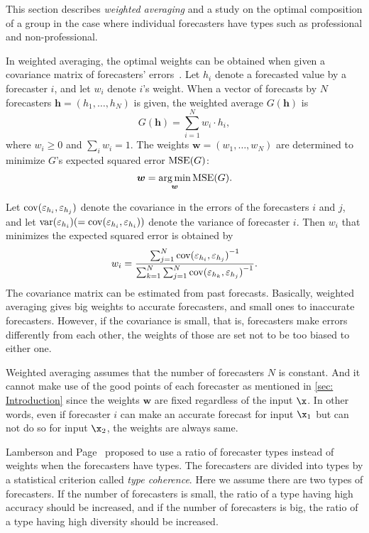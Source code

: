 \documentclass[../main.tex]{subfiles}
\begin{document}
This section describes \emph{weighted averaging} and a study on the optimal composition of a group in the case where individual forecasters have types such as professional and non-professional.

In weighted averaging, the optimal weights can be obtained when given a covariance matrix of forecasters' errors~\cite{Zhou2012}.
Let $h_i$ denote a forecasted value by a forecaster $i$, and let $w_i$ denote $i$'s weight.
When a vector of forecasts by $N$ forecasters $\bm{h} = (h_1, \ldots, h_N)$ is given, the weighted average $G(\bm{h})$ is
\begin{equation}
  G(\bm{h}) = \sum_{i=1}^N w_i \cdot h_i,
  \label{eq: weighted average}
\end{equation}
where $w_i \geq 0$ and $\sum_i w_i = 1$.
The weights $\bm{w} = (w_1, \ldots, w_N)$ are determined to minimize $G$'s expected squared error $\operatorname{MSE}(G)$:
\begin{equation}
  \bm{w} = \operatorname*{arg\,min}_{\bm{w}} \operatorname{MSE}(G).
\end{equation}

Let $\operatorname{cov}(\varepsilon_{h_i},\varepsilon_{h_j})$ denote the covariance in the errors of the forecasters $i$ and $j$, and let $\operatorname{var}(\varepsilon_{h_i}) (= \operatorname{cov}(\varepsilon_{h_i},\varepsilon_{h_i}))$ denote the variance of forecaster $i$.  Then $w_i$ that minimizes the expected squared error is obtained by
\begin{equation}
  w_i = \frac
      {\sum_{j=1}^N {\operatorname{cov}(\varepsilon_{h_i}, \varepsilon_{h_j})}^{-1}}
      {\sum_{k=1}^N \sum_{j=1}^N {\operatorname{cov}(\varepsilon_{h_k}, \varepsilon_{h_j})}^{-1}}.
\end{equation}
The covariance matrix can be estimated from past forecasts.
Basically, weighted averaging gives big weights to accurate forecasters, and small ones to inaccurate forecasters.
However, if the covariance is small, that is, forecasters make errors differently from each other, the weights of those are set not to be too biased to either one.

Weighted averaging assumes that the number of forecasters $N$ is constant.
And it cannot make use of the good points of each forecaster as mentioned in \ref{sec: Introduction} since the weights $\bm{w}$ are fixed regardless of the input $\x$.
In other words, even if forecaster $i$ can make an accurate forecast for input $\x_1$ but can not do so for input $\x_2$, the weights are always same.

Lamberson and Page~\cite{Lamberson2012} proposed to use a ratio of forecaster types instead of weights when the forecasters have types.
The forecasters are divided into types by a statistical criterion called \emph{type coherence}.
Here we assume there are two types of forecasters.
If the number of forecasters is small, the ratio of a type having high accuracy should be increased, and if the number of forecasters is big, the ratio of a type having high diversity should be increased.
\end{document}

